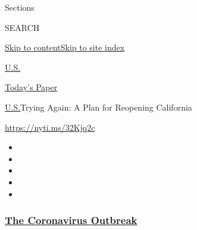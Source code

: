 Sections

SEARCH

\protect\hyperlink{site-content}{Skip to
content}\protect\hyperlink{site-index}{Skip to site index}

\href{https://www.nytimes3xbfgragh.onion/section/us}{U.S.}

\href{https://myaccount.nytimes3xbfgragh.onion/auth/login?response_type=cookie\&client_id=vi}{}

\href{https://www.nytimes3xbfgragh.onion/section/todayspaper}{Today's
Paper}

\href{/section/us}{U.S.}\textbar{}Trying Again: A Plan for Reopening
California

\url{https://nyti.ms/32Kjq2c}

\begin{itemize}
\item
\item
\item
\item
\item
\end{itemize}

\hypertarget{the-coronavirus-outbreak}{%
\subsubsection{\texorpdfstring{\href{https://www.nytimes3xbfgragh.onion/news-event/coronavirus?name=styln-coronavirus-national\&region=TOP_BANNER\&block=storyline_menu_recirc\&action=click\&pgtype=Article\&impression_id=fcced740-f279-11ea-b9bc-3185cbd6b8a2\&variant=undefined}{The
Coronavirus
Outbreak}}{The Coronavirus Outbreak}}\label{the-coronavirus-outbreak}}

